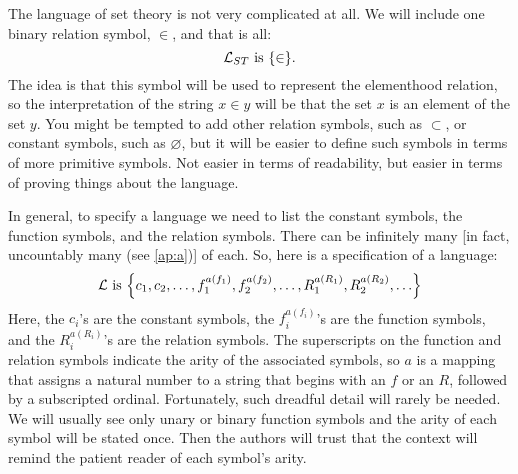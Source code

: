 \begin{eg}\label{1.2.3}
  The language of set theory is not very complicated at all.
  We will include one binary relation symbol, \(\in\), and that is all:
  \[
    \Lc_{ST} \text{ is } \set{\in}.
  \]
  The idea is that this symbol will be used to represent the elementhood relation, so the interpretation of the string \(x \in y\) will be that the set \(x\) is an element of the set \(y\).
  You might be tempted to add other relation symbols, such as \(\subset\), or constant symbols, such as \(\varnothing\), but it will be easier to define such symbols in terms of more primitive symbols.
  Not easier in terms of readability, but easier in terms of proving things about the language.
\end{eg}

\begin{note}
  In general, to specify a language we need to list the constant symbols, the function symbols, and the relation symbols.
  There can be infinitely many [in fact, uncountably many (see \cref{ap:a})] of each.
  So, here is a specification of a language:
  \[
    \Lc \text{ is } \set{c_1, c_2, \dots, f_1^{a(f_1)}, f_2^{a(f_2)}, \dots, R_1^{a(R_1)}, R_2^{a(R_2)}, \dots}
  \]
  Here, the \(c_i\)'s are the constant symbols, the \(f_i^{a(f_i)}\)'s are the function symbols, and the \(R_i^{a(R_i)}\)'s are the relation symbols.
  The superscripts on the function and relation symbols indicate the arity of the associated symbols, so \(a\) is a mapping that assigns a natural number to a string that begins with an \(f\) or an \(R\), followed by a subscripted ordinal.
  Fortunately, such dreadful detail will rarely be needed.
  We will usually see only unary or binary function symbols and the arity of each symbol will be stated once.
  Then the authors will trust that the context will remind the patient reader of each symbol's arity.
\end{note}
